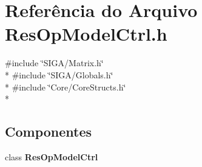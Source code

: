 \section{Referência do Arquivo Res\+Op\+Model\+Ctrl.\+h}
\label{_res_op_model_ctrl_8h}
{\ttfamily \#include \char`\"{}S\+I\+G\+A/\+Matrix.\+h\char`\"{}}\\*
{\ttfamily \#include \char`\"{}S\+I\+G\+A/\+Globals.\+h\char`\"{}}\\*
{\ttfamily \#include \char`\"{}Core/\+Core\+Structs.\+h\char`\"{}}\\*
\subsection*{Componentes}
\begin{DoxyCompactItemize}
\item 
class {\bf Res\+Op\+Model\+Ctrl}
\end{DoxyCompactItemize}
